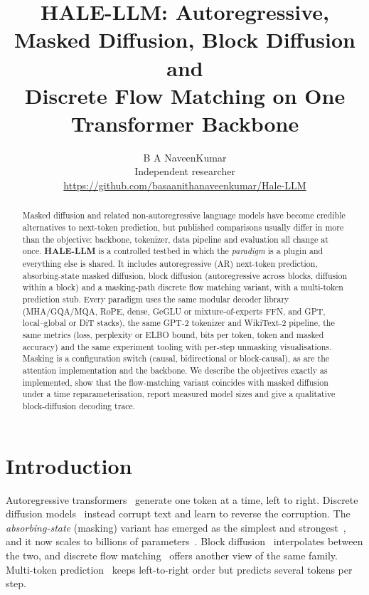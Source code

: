 \documentclass[11pt]{article}
\title{\textbf{HALE-LLM: Autoregressive, Masked Diffusion, Block Diffusion and\\Discrete Flow Matching on One Transformer Backbone}}
\author{B A NaveenKumar\\
\small Independent researcher\\
\small \url{https://github.com/basaanithanaveenkumar/Hale-LLM}}
\date{}
\begin{document}
\maketitle

\begin{abstract}
Masked diffusion and related non-autoregressive language models have become credible
alternatives to next-token prediction, but published comparisons usually differ in more
than the objective: backbone, tokenizer, data pipeline and evaluation all change at once.
\textbf{HALE-LLM} is a controlled testbed in which the \emph{paradigm} is a plugin and
everything else is shared. It includes autoregressive (AR) next-token prediction,
absorbing-state masked diffusion, block diffusion (autoregressive across blocks, diffusion
within a block) and a masking-path discrete flow matching variant, with a multi-token
prediction stub. Every paradigm uses the same modular decoder library (MHA/GQA/MQA, RoPE,
dense, GeGLU or mixture-of-experts FFN, and GPT, local--global or DiT stacks), the same
GPT-2 tokenizer and WikiText-2 pipeline, the same metrics (loss, perplexity or ELBO bound,
bits per token, token and masked accuracy) and the same experiment tooling with
per-step unmasking visualisations. Masking is a configuration switch (causal,
bidirectional or block-causal), as are the attention implementation and the backbone. We
describe the objectives exactly as implemented, show that the flow-matching variant
coincides with masked diffusion under a time reparameterisation, report measured model
sizes and give a qualitative block-diffusion decoding trace.
\end{abstract}

\section{Introduction}

Autoregressive transformers~\cite{vaswani2017attention,radford2019gpt2} generate one token at a
time, left to right. Discrete diffusion models~\cite{austin2021d3pm,lou2024sedd} instead corrupt
text and learn to reverse the corruption. The \emph{absorbing-state} (masking) variant has
emerged as the simplest and strongest~\cite{sahoo2024mdlm,shi2024md4}, and it now scales to
billions of parameters~\cite{nie2025llada}. Block diffusion~\cite{arriola2025bd3lm}
interpolates between the two, and discrete flow matching~\cite{gat2024dfm} offers another view of
the same family. Multi-token prediction~\cite{gloeckle2024mtp} keeps left-to-right order but
predicts several tokens per step.
\end{document}
